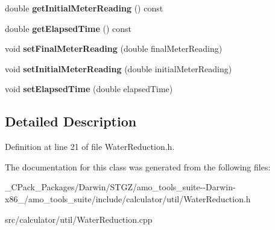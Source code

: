 \begin{DoxyCompactItemize}
double {\bfseries get\+Initial\+Meter\+Reading} () const
\item 
\mbox{\label{class_volume_meter_method_data_a6551ffb2db97c7158cf19ac3908e5007}} 
double {\bfseries get\+Elapsed\+Time} () const
\item 
\mbox{\label{class_volume_meter_method_data_a0502a308919b685c68bcfbaab0922a53}} 
void {\bfseries set\+Final\+Meter\+Reading} (double final\+Meter\+Reading)
\item 
\mbox{\label{class_volume_meter_method_data_a7d2aae1eba1dc115caded2cb6b7bd9a5}} 
void {\bfseries set\+Initial\+Meter\+Reading} (double initial\+Meter\+Reading)
\item 
\mbox{\label{class_volume_meter_method_data_a41cf3174466d024c8dab4a1f5705a779}} 
void {\bfseries set\+Elapsed\+Time} (double elapsed\+Time)
\end{DoxyCompactItemize}


\subsection{Detailed Description}


Definition at line 21 of file Water\+Reduction.\+h.



The documentation for this class was generated from the following files\+:\begin{DoxyCompactItemize}
\item 
\+\_\+\+C\+Pack\+\_\+\+Packages/\+Darwin/\+S\+T\+G\+Z/amo\+\_\+tools\+\_\+suite-\/-\/\+Darwin-\/x86\+\_/amo\+\_\+tools\+\_\+suite/include/calculator/util/Water\+Reduction.\+h\item 
src/calculator/util/Water\+Reduction.\+cpp\end{DoxyCompactItemize}

